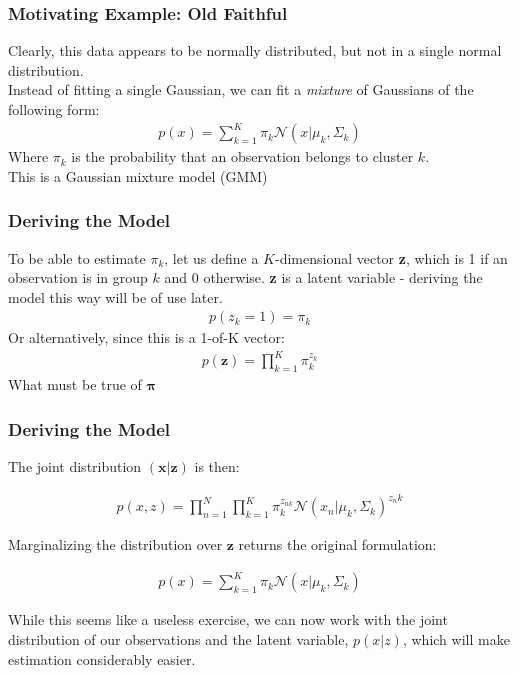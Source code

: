 \documentclass{beamer}
\begin{document}
\begin{frame}
\frametitle{Motivating Example: Old Faithful}
Clearly, this data appears to be normally distributed, but not in a single normal distribution.\\
Instead of fitting a single Gaussian, we can fit a \textit{mixture} of Gaussians of the following form:
\begin{align*}
p(x) = \sum_{k=1}^{K} \pi_k \mathcal{N} (x | \mu_k, \Sigma_k)
\end{align*}
Where $\pi_k$ is the probability that an observation belongs to cluster $k$. \\
This is a Gaussian mixture model (GMM)
\end{frame}

\begin{frame}
\frametitle{Deriving the Model}
	To be able to estimate $\pi_k$, let us define a $K$-dimensional vector \textbf{z}, which is 1 if an observation is in group $k$ and 0 otherwise. \textbf{z} is a latent variable - deriving the model this way will be of use later.\\
	\begin{align*}
	p(z_k = 1) = \pi_k
	\end{align*}
	Or alternatively, since this is a 1-of-K vector:
	\begin{align*}
	p(\mathbf{z})  = \prod_{k = 1}^{K} \pi_k^{z_k}
	\end{align*}
	What must be true of $\mathbf{\pi}$

\end{frame}

 \begin{frame}
 \frametitle{Deriving the Model}
 
 	The joint distribution $(\mathbf{x} | \mathbf{z})$ is then:

 	\begin{align*}
 	p(x,z) = \prod_{n = 1}^{N} \prod_{k = 1}^{K} \pi_k^{z_{nk}} \mathcal{N}(x_n | \mu_k, \Sigma_k)^{z_nk}
 	\end{align*}
 	
 	Marginalizing the distribution over $\mathbf{z}$ returns the original formulation:
 	
 	\begin{align*}
 	p(x) = \sum_{k=1}^{K} \pi_k \mathcal{N} (x | \mu_k, \Sigma_k)
 	\end{align*}
 	
 	While this seems like a useless exercise, we can now work with the joint distribution of our observations and the latent variable, $p(x|z)$, which will make estimation considerably easier.
 
 \end{frame}
\end{document}
